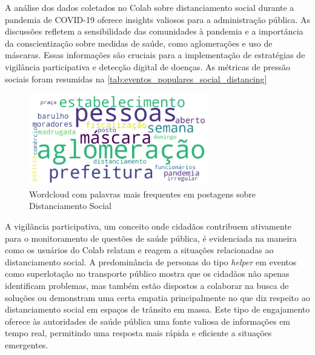 A análise dos dados coletados no Colab sobre distanciamento social durante a pandemia de COVID-19 oferece insights valiosos para a administração pública. As discussões refletem a sensibilidade das comunidades à pandemia e a importância da conscientização sobre medidas de saúde, como aglomerações e uso de máscaras. Essas informações são cruciais para a implementação de estratégias de vigilância participativa e detecção digital de doenças. As métricas de pressão sociais foram resumidas na \autoref{tab:eventos_populares_social_distancing}

\begin{figure}[htb]
	\centering
	\includegraphics[width=0.7\textwidth]{images/wordcloud_social_distancing.png}
	\caption{Wordcloud com palavras mais frequentes em postagens sobre Distanciamento Social}
	\label{fig:wordcloud_social_distancing}
\end{figure}

A vigilância participativa, um conceito onde cidadãos contribuem ativamente para o monitoramento de questões de saúde pública, é evidenciada na maneira como os usuários do Colab relatam e reagem a situações relacionadas ao distanciamento social. A predominância de personas do tipo \textit{helper} em eventos como superlotação no transporte público mostra que os cidadãos não apenas identificam problemas, mas também estão dispostos a colaborar na busca de soluções ou demonstram uma certa empatia principalmente no que diz respeito ao distanciamento social em espaços de trânsito em massa. Este tipo de engajamento oferece às autoridades de saúde pública uma fonte valiosa de informações em tempo real, permitindo uma resposta mais rápida e eficiente a situações emergentes.

